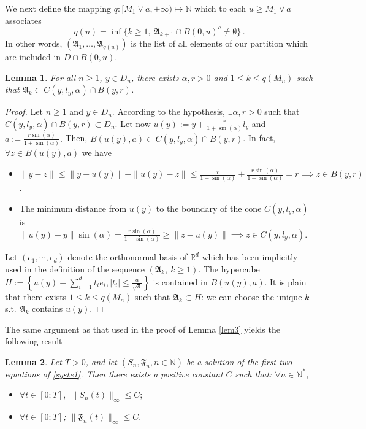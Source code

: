 \documentclass[notitlepage,reqno,11pt]{amsart}
\numberwithin{equation}{section}
\newtheorem{lemma}{Lemma}[section]
\def\R{\mathbb{R}}
\begin{document}
We next define the mapping $q:[M_1\vee a,+\infty)\mapsto \mathbb{N}$  which to each $u\ge M_1\vee a$ associates 
\[ q(u)=\inf\{k\ge1,\ \mathfrak{A}_{k+1}\cap B(0,u)^c\not=\emptyset\}\,.\]
In other words, $(\mathfrak{A}_1,\ldots,\mathfrak{A}_{q(u)})$ is the list of all elements of our partition which are included in $D\cap B(0,u)$.
\begin{lemma}
\label{impor}
For all $n\ge 1$,  $y\in D_{n}$, there exists $  \alpha ,r>0$ and $1\leq k \leq q(M_n)$ such that $\mathfrak{A}_k \subset C(y,l_y, \alpha)\cap B(y,r)$.
\end{lemma}
\begin{proof}
Let $n\ge1$ and $y\in D_{n}$. According to the hypothesis, $\exists \alpha,r>0$ such that $C(y,l_y, \alpha)\cap B(y,r) \subset D_{n}$.
 Let now $u(y):=y+\frac{r}{1+\sin(\alpha)}l_y$ and $a:=\frac{r\sin(\alpha)}{1+\sin(\alpha)}.$ Then,  $B(u(y),a)\subset C(y,l_y, \alpha)\cap B(y,r)  $. In fact,  $\forall z\in B(u(y),a)$ we have
 \begin{itemize}
 \item $ \|y-z\|\leq \|y-u(y)\|+\|u(y)-z\| \leq \frac{r}{1+\sin(\alpha)}+\frac{r\sin(\alpha)}{1+\sin(\alpha)}=r\implies z \in B(y,r)$ .
\item The minimum distance from $u(y)$ to the boundary of the cone $C(y,l_y,\alpha)$ is\\ $\|u(y)-y\|\sin (\alpha)= \frac{r\sin (\alpha)}{1+\sin(\alpha)}\geq \|z-u(y)\|\implies z \in C(y,l_y, \alpha)$.
\end{itemize}
Let $(e_1,\cdots,e_d)$ denote the orthonormal basis of $\R^d$ which has been implicitly used in the definition of the sequence $(\mathfrak{A}_k,\ k\ge1)$. The hypercube $H:=\left\{ u(y)+\displaystyle \sum_{i=1}^d t_i e_i, |t_i|\leq \frac{a}{\sqrt{d}}\right\}$ is contained in $B(u(y),a)$. 
It is plain that there exists $1\le k\le q(M_n)$ such that $\mathfrak{A}_k\subset H$: we can choose the unique $k$ s.t. $\mathfrak{A}_k$  contains $u(y)$.
\end{proof}
The same argument as that used in the proof of Lemma \ref{lem3} yields the following result
\begin{lemma}
	\label{lem4}
	Let $T>0$, and let $(S_{n},\mathfrak{F}_{n} , n\in \mathbb{N})$  be a solution of the first two equations of \eqref{syste1}. Then there exists a positive constant $C$ such that: $\forall n \in \mathbb{N}^*$,
	\begin{itemize}
		\item $\forall t\in[0;T],$ $\|S_{n}(t)\|_{\infty}\leq C;$
		\item $\forall t\in[0;T]$; $\|\mathfrak{F}_{n}(t)\|_{\infty}\leq C.$
	\end{itemize}
\end{lemma}
\end{document}
